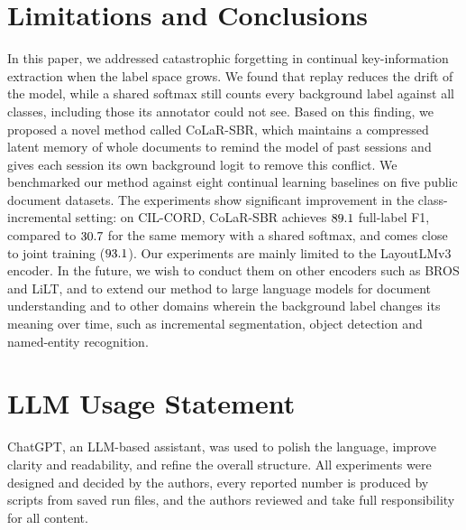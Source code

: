 \documentclass[10pt,twocolumn,letterpaper]{article}
\newif\ifwithappendix \withappendixtrue
\begin{document}
\section{Limitations and Conclusions}
\label{sec:limitations}
\label{sec:conclusion}
In this paper, we addressed catastrophic forgetting in continual key-information extraction when the label space grows. We found that replay reduces the drift of the model, while a shared softmax still counts every background label against all classes, including those its annotator could not see. Based on this finding, we proposed a novel method called CoLaR-SBR, which maintains a compressed latent memory of whole documents to remind the model of past sessions and gives each session its own background logit to remove this conflict. We benchmarked our method against eight continual learning baselines on five public document datasets. The experiments show significant improvement in the class-incremental setting: on CIL-CORD, CoLaR-SBR achieves $89.1$ full-label F1, compared to $30.7$ for the same memory with a shared softmax, and comes close to joint training ($93.1$). Our experiments are mainly limited to the LayoutLMv3 encoder. In the future, we wish to conduct them on other encoders such as BROS and LiLT, and to extend our method to large language models for document understanding and to other domains wherein the background label changes its meaning over time, such as incremental segmentation, object detection and named-entity recognition.\label{mainend}%

\section*{LLM Usage Statement}
ChatGPT, an LLM-based assistant, was used to polish the language, improve clarity and readability, and refine the overall structure. All experiments were designed and decided by the authors, every reported number is produced by scripts from saved run files, and the authors reviewed and take full responsibility for all content.
{
    \small
      {}
}

\ifwithappendix\clearpage{}\appendix\fi
\end{document}
